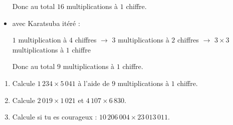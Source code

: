 \documentclass[class=report,crop=false, 12pt]{standalone}
\begin{document}
\begin{activite}
\begin{itemize}
  Donc au total $16$ multiplications à $1$ chiffre.
  
  
  \item avec Karatsuba itéré :
   
    \centerline{\small
  $1$ multiplication à $4$ chiffres 
  $\longrightarrow$ $3$ \og multiplications à $2$ chiffres\fg{}
  $\longrightarrow$ $3 \times 3$ \og multiplications à $1$ chiffre\fg{}
  }
  
  Donc au total $9$ \og multiplications à $1$ chiffre\fg{}.
  
\end{itemize}


\begin{enumerate} 
  \item Calcule $1\,234 \times 5\,041$ à l'aide de $9$ \og multiplications à $1$ chiffre\fg{}.
  \item Calcule $2\,019 \times 1\,021$ et  $4\,107 \times 6\,830$.
  \item Calcule si tu es courageux : $10\,206\,004 \times 23\,013\,011$.
\end{enumerate}
  
\end{activite}
\end{document}
